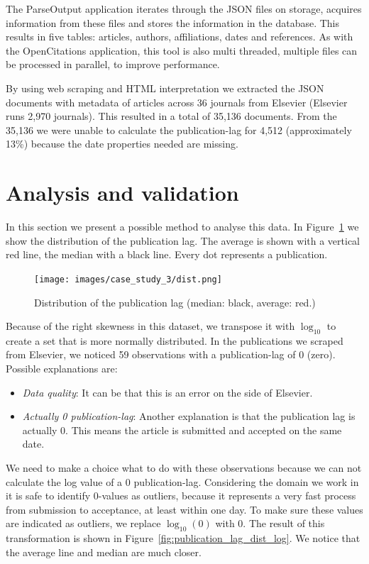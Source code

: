 \documentclass{ou-report}
\begin{document}
The ParseOutput application iterates through the JSON files on storage, acquires
information from these files and stores the information in the database. This
results in five tables: articles, authors, affiliations, dates and references.
As with the OpenCitations application, this tool is also multi threaded,
multiple files can be processed in parallel, to improve performance.

By using web scraping and HTML interpretation we extracted the JSON documents 
with metadata of articles across 36 journals from Elsevier (Elsevier runs 2,970 
journals). This resulted in a total of 35,136 documents. From the 35,136 we were
unable to calculate the publication-lag for 4,512 (approximately 13\%) because 
the date properties needed are missing.

\section{Analysis and validation}
In this section we present a possible method to analyse this data. 
In Figure~\ref{fig:publication_lag_dist} we show the distribution of the
publication lag. The average is shown with a vertical red line, the median with
a black line. Every dot represents a publication.
\begin{figure}[H]
    \centering
    \texttt{[image: images/case\_study\_3/dist.png]}
    \caption{Distribution of the publication lag (median: black, average: red.)}
    \label{fig:publication_lag_dist}
\end{figure}
Because of the right skewness in this dataset, we transpose it with $\log_{10}$ to
create a set that is more normally distributed. 
In the publications we scraped from Elsevier, we noticed 59 observations with a
publication-lag of 0 (zero). Possible explanations are:
\begin{itemize}
    \item \emph{Data quality}: It can be that this is an error on the side of
        Elsevier.
    \item \emph{Actually 0 publication-lag}: Another explanation is that the
        publication lag is actually 0. This means the article is submitted and
        accepted on the same date. 
\end{itemize}
We need to make a choice what to do with these observations because we can not
calculate the log value of a 0 publication-lag. Considering the domain we work
in it is safe to identify 0-values as outliers, because it represents a very
fast process from submission to acceptance, at least within one day. To make
sure these values are indicated as outliers, we replace $\log_{10} (0)$ with 0.
The result of this transformation is shown in
Figure~\ref{fig:publication_lag_dist_log}. We notice that the average line and
median are much closer.
\end{document}
